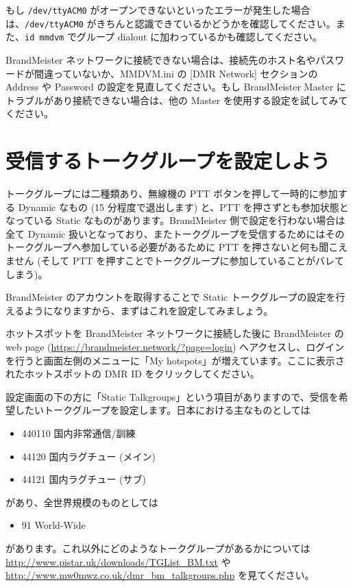 \documentclass[a4j,oneside]{ujbook}
\begin{document}
もし \verb+/dev/ttyACM0+ がオープンできないといったエラーが発生した場合は、\verb+/dev/ttyACM0+ がきちんと認識できているかどうかを確認してください。また、\verb+id mmdvm+ でグループ dialout に加わっているかも確認してください。

BrandMeister ネットワークに接続できない場合は、接続先のホスト名やパスワードが間違っていないか、MMDVM.ini の [DMR Network] セクションの Address や Password の設定を見直してください。もし BrandMeister Master にトラブルがあり接続できない場合は、他の Master を使用する設定を試してみてください。

\section{受信するトークグループを設定しよう}

トークグループには二種類あり、無線機の PTT ボタンを押して一時的に参加する Dynamic なもの (15 分程度で退出します) と、PTT を押さずとも参加状態となっている Static なものがあります。BrandMeister 側で設定を行わない場合は全て Dynamic 扱いとなっており、またトークグループを受信するためにはそのトークグループへ参加している必要があるために PTT を押さないと何も聞こえません (そして PTT を押すことでトークグループに参加していることがバレてしまう)。

BrandMeister のアカウントを取得することで Static トークグループの設定を行えるようになりますから、まずはこれを設定してみましょう。

ホットスポットを BrandMeister ネットワークに接続した後に BrandMeister の web page (\url{https://brandmeister.network/?page=login}) へアクセスし、ログインを行うと画面左側のメニューに「My hotspots」が増えています。ここに表示されたホットスポットの DMR ID をクリックしてください。

設定画面の下の方に「Static Talkgroups」という項目がありますので、受信を希望したいトークグループを設定します。日本における主なものとしては
\begin{itemize}
 \item 440110 国内非常通信/訓練
 \item 44120 国内ラグチュー (メイン)
 \item 44121 国内ラグチュー (サブ)
\end{itemize}
があり、全世界規模のものとしては
\begin{itemize}
 \item 91 World-Wide
\end{itemize}
があります。これ以外にどのようなトークグループがあるかについては \url{http://www.pistar.uk/downloads/TGList_BM.txt} や \url{http://www.mw0mwz.co.uk/dmr_bm_talkgroups.php} を見てください。
\end{document}

